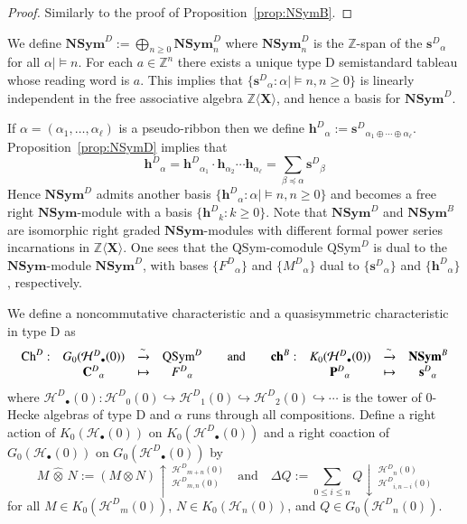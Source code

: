 \documentclass{amsart}
\newtheorem*{Young's Rule}{Young's Rule}
\theoremstyle{definition}
\theoremstyle{remark}
\numberwithin{equation}{section}
\begin{document}
\begin{proof}
Similarly to the proof of Proposition~\ref{prop:NSymB}.
\end{proof}

We define ${\mathbf{NSym}}^D:=\bigoplus_{n\ge0}{\mathbf{NSym}}^D_n$ where ${\mathbf{NSym}}^D_n$ is the ${{\mathbb Z}}$-span of the ${\mathbf{s}^D}_\alpha$ for all $\alpha\mid\models n$. For each $a\in{{\mathbb Z}}^n$ there exists a unique type D semistandard tableau whose reading word is $a$. This implies that $\{{\mathbf{s}^D}_\alpha:\alpha\mid\models n, n\ge0\}$ is linearly independent in the free associative algebra ${{\mathbb Z}}\langle{\mathbf{X}}\rangle$, and hence a basis for ${\mathbf{NSym}}^D$. 

If $\alpha=(\alpha_1,\ldots,\alpha_\ell)$ is a pseudo-ribbon then we define ${\mathbf{h}^D}_\alpha:={\mathbf{s}^D}_{\alpha_1\oplus\cdots\oplus\alpha_\ell}$. Proposition~\ref{prop:NSymD} implies that 
\[ {\mathbf{h}^D}_\alpha={\mathbf{h}^D}_{\alpha_1}\cdot {{\mathbf h}}_{\alpha_2}\cdots{{\mathbf h}}_{\alpha_\ell} = \sum_{\beta{\operatorname{\preccurlyeq}} \alpha}{\mathbf{s}^D}_\beta\]
Hence ${\mathbf{NSym}}^D$ admits another basis $\{{\mathbf{h}^D}_\alpha:\alpha\mid\models n, n\ge0\}$ and becomes a free right ${\mathbf{NSym}}$-module with a basis $\{{\mathbf{h}^D}_{k}:k\ge0\}$. Note that ${\mathbf{NSym}}^D$ and ${\mathbf{NSym}}^B$ are isomorphic right graded ${\mathbf{NSym}}$-modules with  different formal power series incarnations in ${{\mathbb Z}}\langle {\mathbf{X}}\rangle$. One sees that the ${\mathrm{QSym}}$-comodule ${\mathrm{QSym}}^D$ is dual to the ${\mathbf{NSym}}$-module ${\mathbf{NSym}}^D$, with bases $\{{F^D}_\alpha\}$ and $\{{M^D}_\alpha\}$ dual to $\{{\mathbf{s}^D}_\alpha\}$ and $\{{\mathbf{h}^D}_\alpha\}$, respectively.

We define a noncommutative characteristic and a quasisymmetric characteristic in type D as
\[ \begin{array}{ccccccccc}
\mathrm{Ch}^D: & G_0({\mathcal{H}^D}_\bullet(0)) & \xrightarrow\sim & {\mathrm{QSym}}^D & \quad{\rm and}\quad & \mathbf{ch}^B: & K_0({\mathcal{H}^D}_\bullet(0)) & \xrightarrow\sim & {\mathbf{NSym}}^B \\
& {\mathbf{C}^D}_\alpha & \mapsto & {F^D}_\alpha & & & {\mathbf{P}^D}_\alpha & \mapsto & {\mathbf{s}^D}_\alpha
\end{array} \]
where ${\mathcal{H}^D}_\bullet(0): {\mathcal{H}^D}_0(0)\hookrightarrow {\mathcal{H}^D}_1(0) \hookrightarrow {\mathcal{H}^D}_2(0) \hookrightarrow\cdots$ is the tower of 0-Hecke algebras of type D and $\alpha$ runs through all compositions. Define a right action of $K_0({\mathcal{H}}_\bullet(0))$ on $K_0({\mathcal{H}^D}_\bullet(0))$ and a right coaction of $G_0({\mathcal{H}}_\bullet(0))$ on $G_0({\mathcal{H}^D}_\bullet(0))$ by
\[ M \,\widehat{\otimes}\, N := (M\otimes N)\uparrow\,_{{\mathcal{H}^D}_{m,n}(0)}^{{\mathcal{H}^D}_{m+n}(0)}
{\quad\text{and}\quad}  \Delta Q := \sum_{0\le i\le n} Q\downarrow\,_{{\mathcal{H}^D}_{i,n-i}(0)}^{{\mathcal{H}^D}_{n}(0)} \]
for all $M\in K_0({\mathcal{H}^D}_m(0))$, $N\in K_0({\mathcal{H}}_n(0))$, and $Q\in G_0({\mathcal{H}^D}_n(0))$. 
\end{document}
